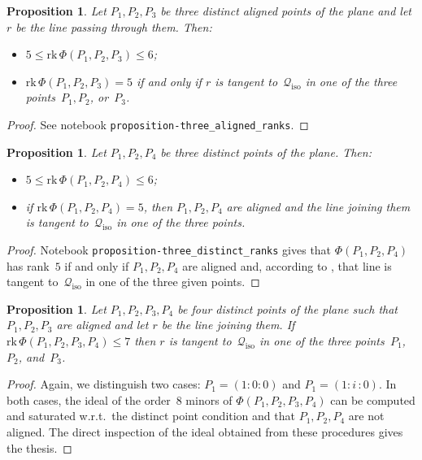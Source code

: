 \documentclass[a4paper, 11pt, reqno]{amsart}
\theoremstyle{plain}
\newtheorem{prop}[lemma]{Proposition}
\theoremstyle{definition}
\newcommand{\iii}{\textit{i}\,}
\newcommand{\rk}{\ensuremath{\mathrm{rk}}}
\newcommand{\iso}{\mathcal{Q}_{\mathrm{iso}}}
\begin{document}
\begin{prop}
\label{proposition:three_aligned_ranks}
Let $P_1, P_2, P_3$ be three distinct aligned points of the plane and let
$r$ be the line passing through them. Then:
%
\begin{itemize}
  \item $5 \leq \rk \,\Phi(P_1, P_2, P_3) \leq 6$;
  \item $\rk \,\Phi(P_1, P_2, P_3) = 5$ if and only if $r$ is tangent to~$\iso$ in one of the three points~$P_1, P_2$, or~$P_3$.
\end{itemize}
%
\end{prop}
\begin{proof}
See notebook \texttt{proposition-three\_aligned\_ranks}.
\end{proof}

\begin{prop}
\label{proposition:three_distinct_ranks}
Let $P_1, P_2, P_4$ be three distinct points of the plane. Then:
%
\begin{itemize}
  \item $5 \leq \rk \,\Phi(P_1, P_2, P_4) \leq 6$;
  \item if
  $\rk \, \Phi(P_1, P_2, P_4) = 5$, then $P_1, P_2, P_4$
  are aligned and the line joining them is tangent to~$\iso$
  in one of the three points.
\end{itemize}
%
\end{prop}
\begin{proof}
Notebook \texttt{proposition-three\_distinct\_ranks} gives that $\Phi(P_1, P_2, P_4)$ has rank~$5$ if and only if $P_1, P_2, P_4$ are aligned and, according to ,
that line is tangent to~$\iso$ in one of the three given points.
\end{proof}

\begin{prop}
\label{prop:condition3+1}
Let $P_1, P_2, P_3, P_4$ be four distinct points of the plane such that
$P_1, P_2, P_3$ are aligned and let $r$ be the line joining them.
If $\rk \,\Phi(P_1, P_2, P_3, P_4) \leq 7$ then $r$ is tangent to~$\iso$ in one of the three points~$P_1$,  $P_2$, and~$P_3$.
\end{prop}
\begin{proof}
Again, we distinguish two cases: $P_1 = (1: 0: 0)$ and
$P_1 = (1: \iii: 0)$. In both cases, the ideal of the order~$8$
minors of $\Phi(P_1, P_2, P_3, P_4)$ can be computed and saturated
w.r.t.\ the distinct point condition and that
$P_1, P_2, P_4$ are not aligned.
The direct inspection of the ideal obtained from these procedures gives the thesis.
\end{proof}
\end{document}
